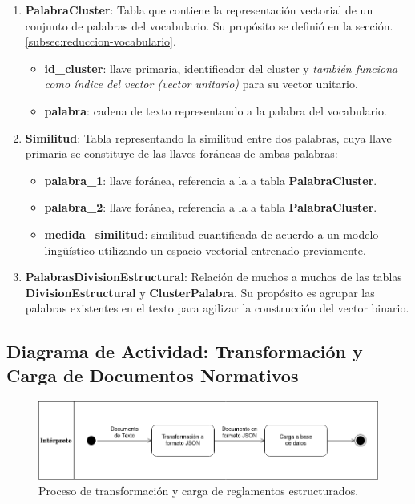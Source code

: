 \begin{enumerate}
   \item \textbf{PalabraCluster}: Tabla que contiene la representación vectorial de un conjunto de palabras del vocabulario. Su propósito se definió en la sección. \ref{subsec:reduccion-vocabulario}.
   
   
   \begin{itemize}
       \item \textbf{id\_cluster}: llave primaria, identificador del cluster y \textit{también funciona como índice del vector (vector unitario)} para su vector unitario.
       \item \textbf{palabra}: cadena de texto representando a la palabra del vocabulario.
   \end{itemize}
   
   \item \textbf{Similitud}: Tabla representando la similitud entre dos palabras, cuya llave primaria se constituye de las llaves foráneas de ambas palabras:
   
   \begin{itemize}
       \item \textbf{palabra\_1}: llave foránea, referencia a la a tabla \textbf{PalabraCluster}.
       \item \textbf{palabra\_2}: llave foránea, referencia a la a tabla \textbf{PalabraCluster}.
       \item \textbf{medida\_similitud}: similitud cuantificada de acuerdo a un modelo lingüístico utilizando un espacio vectorial entrenado previamente.
   \end{itemize}

    \item \textbf{PalabrasDivisionEstructural}: Relación de muchos a muchos de las tablas \textbf{DivisionEstructural} y \textbf{ClusterPalabra}. Su propósito es agrupar las palabras existentes en el texto para agilizar la construcción del vector binario.
\end{enumerate}

\subsection{Diagrama de Actividad: Transformación y Carga de Documentos Normativos}

\begin{figure}[ht]
    \centering
    \includegraphics[scale=0.54]{images/5/actividad-transformacion.png}
    \caption{Proceso de transformación y carga de reglamentos estructurados.}
    \label{fig:actividad-transformacion}
\end{figure}

